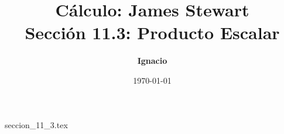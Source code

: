 \documentclass[11pt,spanish,oneside]{report}
\title{\textbf{Cálculo: James Stewart} \\ \Large Sección 11.3: Producto Escalar}
\author{\textbf{Ignacio}}
\date{\today}
\begin{document}
\maketitle

{seccion_11_3.tex}
\end{document}
